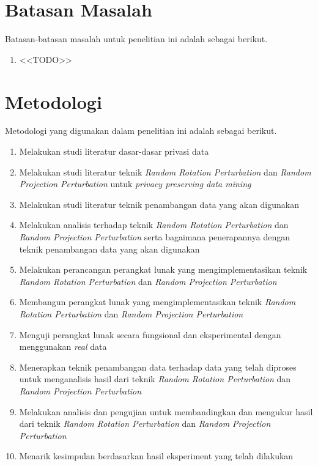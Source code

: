 \section{Batasan Masalah}
\label{sec:batasan}
Batasan-batasan masalah untuk penelitian ini adalah sebagai berikut.
\begin{enumerate}
    \item <<TODO>>
\end{enumerate}


\section{Metodologi}
\label{sec:metlit}
Metodologi yang digunakan dalam penelitian ini adalah sebagai berikut.
\begin{enumerate}
    \item Melakukan studi literatur dasar-dasar privasi data
    \item Melakukan studi literatur teknik \textit{Random Rotation Perturbation} dan \textit{Random Projection Perturbation} untuk \textit{privacy preserving data mining}
    \item Melakukan studi literatur teknik penambangan data yang akan digunakan
    \item Melakukan analisis terhadap teknik \textit{Random Rotation Perturbation} dan \textit{Random Projection Perturbation} serta bagaimana penerapannya dengan teknik penambangan data yang akan digunakan
    \item Melakukan perancangan perangkat lunak yang mengimplementasikan teknik \textit{Random Rotation Perturbation} dan \textit{Random Projection Perturbation}
    \item Membangun perangkat lunak yang mengimplementasikan teknik \textit{Random Rotation Perturbation} dan \textit{Random Projection Perturbation}
    \item Menguji perangkat lunak secara fungsional dan eksperimental dengan menggunakan \textit{real} data
    \item Menerapkan teknik penambangan data terhadap data yang telah diproses untuk menganalisis hasil dari teknik \textit{Random Rotation Perturbation} dan \textit{Random Projection Perturbation}
    \item Melakukan analisis dan pengujian untuk membandingkan dan mengukur hasil dari teknik \textit{Random Rotation Perturbation} dan \textit{Random Projection Perturbation}
    \item Menarik kesimpulan berdasarkan hasil eksperiment yang telah dilakukan
\end{enumerate}

